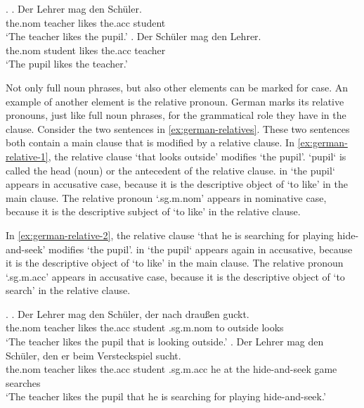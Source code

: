 \ex.\label{ex:german-case}
\ag. Der Lehrer mag den Schüler.\\
 the.\ac{nom} teacher likes the.\ac{acc} student\\
 `The teacher likes the pupil.'\label{ex:german-case-1}
\bg. Der Schüler mag den Lehrer.\\
 the.\ac{nom} student likes the.\ac{acc} teacher\\
 `The pupil likes the teacher.' \label{ex:german-case-2}

Not only full noun phrases, but also other elements can be marked for case. An example of another element is the relative pronoun. German marks its relative pronouns, just like full noun phrases, for the grammatical role they have in the clause. Consider the two sentences in \ref{ex:german-relatives}. These two sentences both contain a main clause that is modified by a relative clause.
In \ref{ex:german-relative-1}, the relative clause  `that looks outside' modifies  `the pupil'.  `pupil` is called the head (noun) or the antecedent of the relative clause.  in  `the pupil` appears in accusative case, because it is the descriptive object of  `to like' in the main clause. The relative pronoun  `.\ac{sg}.\ac{m}.\ac{nom}' appears in nominative case, because it is the descriptive subject of  `to like' in the relative clause.

In \ref{ex:german-relative-2}, the relative clause  `that he is searching for playing hide-and-seek' modifies  `the pupil'.  in  `the pupil` appears again in accusative, because it is the descriptive object of  `to like' in the main clause. The relative pronoun  `.\ac{sg}.\ac{m}.\ac{acc}' appears in accusative case, because it is the descriptive object of  `to search' in the relative clause.

\ex.\label{ex:german-relatives}
\ag. Der Lehrer mag den Schüler, der nach draußen guckt.\\
 the.\ac{nom} teacher likes the.\ac{acc} student .\ac{sg}.\ac{m}.\ac{nom} to outside looks\\
 `The teacher likes the pupil that is looking outside.'\label{ex:german-relative-1}
 \bg. Der Lehrer mag den Schüler, den er beim Versteckspiel sucht.\\
 the.\ac{nom} teacher likes the.\ac{acc} student .\ac{sg}.\ac{m}.\ac{acc} he {at the} {hide-and-seek game} searches\\
 `The teacher likes the pupil that he is searching for playing hide-and-seek.' \label{ex:german-relative-2}

